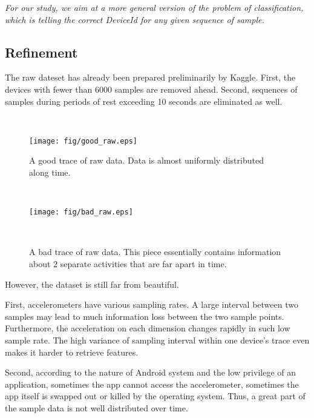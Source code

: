 \documentclass{article} %
\begin{document}
 \emph{For our study, we aim at a more general version of the problem of classification, which is telling the correct DeviceId for any given sequence of sample.}

\subsection{Refinement}
The raw dateset has already been prepared preliminarily by Kaggle. First, the devices with fewer than 6000 samples are removed ahead. Second, sequences of samples during periods of rest exceeding 10 seconds are eliminated as well. 

\begin{figure}
    \hspace{-0.5cm}
    \begin{minipage}[t]{0.02\textwidth}~
    \end{minipage}
    \begin{minipage}[t]{0.47\textwidth}
    \centering
    \texttt{[image: fig/good\_raw.eps]}
    \caption{A good trace of raw data. Data is almost uniformly distributed along time. }
    \label{fig:good_raw}
    \end{minipage}
    \begin{minipage}[t]{0.02\textwidth}~
    \end{minipage}
    \begin{minipage}[t]{0.47\textwidth}
    \centering
    \texttt{[image: fig/bad\_raw.eps]}\\
    \caption{A bad trace of raw data. This piece essentially contains information about 2 separate activities that are far apart in time.}
    \label{fig:bad_raw}
    \end{minipage}
    \begin{minipage}[t]{0.02\textwidth}~
    \end{minipage}%
 \end{figure}


However, the dataset is still far from beautiful.

First, accelerometers have various sampling rates. A large interval between two samples may lead to much information loss between the two sample points. Furthermore, the acceleration on each dimension changes rapidly in such low sample rate. The high variance of sampling interval within one device's trace even makes it harder to retrieve features.

Second, according to the nature of Android system and the low privilege of an application, sometimes the app cannot access the accelerometer, sometimes the app itself is swapped out or killed by the operating system. Thus, a great part of the sample data is not well distributed over time.
\end{document}
